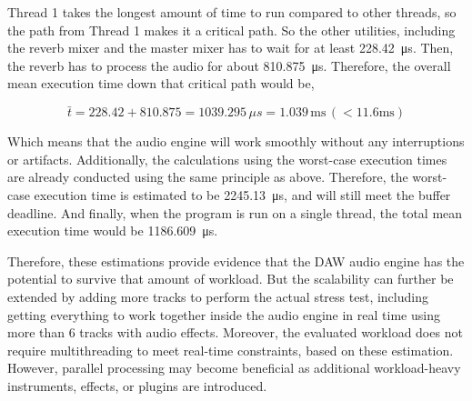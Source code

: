 Thread 1 takes the longest amount of time to run compared to other threads, so the path from Thread 1 makes it
a critical path. So the other utilities, including the reverb mixer and the master mixer has to wait for at 
least \SI{228.42}{\micro\second}. Then, the reverb has to process the audio for about \SI{810.875}{\micro\second}. 
Therefore, the overall mean execution time down that critical path would be,

$$
\bar{t} = 228.42 + 810.875 = 1039.295\,\mu s = 1.039\, \text{ms}\, (< 11.6 \text{ms})
$$

Which means that the audio engine will work smoothly without any interruptions or artifacts. Additionally,
the calculations using the worst-case execution times are already conducted using the same principle as above.
Therefore, the worst-case execution time is estimated to be \SI{2245.13}{\micro\second}, and will still meet 
the buffer deadline. And finally, when the program is run on a single thread, the total mean execution time
would be \SI{1186.609}{\micro\second}.

Therefore, these estimations provide evidence that the DAW audio engine has the potential to survive that amount of workload. But the scalability
can further be extended by adding more tracks to perform the actual stress test, including getting everything to work together inside the audio engine 
in real time using more than 6 tracks with audio effects. Moreover, the evaluated workload does not require multithreading to meet real-time constraints,
based on these estimation. However, parallel processing may become beneficial as additional workload-heavy instruments, effects, or plugins are introduced.
